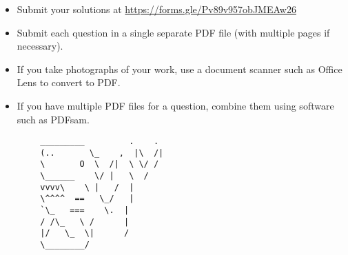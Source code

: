 \documentclass{article}
\begin{document}
	
	\vfill
	\small
	\begin{itemize}
		\item Submit your solutions at \href{https://forms.gle/Pv89v957obJMEAw26}{https://forms.gle/Pv89v957obJMEAw26}
		\item Submit each question in a single separate PDF file (with multiple pages if necessary).
		\item If you take photographs of your work, use a document scanner such as Office Lens to convert to PDF.
		\item If you have multiple PDF files for a question, combine them using software such as PDFsam.
	\end{itemize}
	
	\vfill
	\centering
	\small
	\begin{BVerbatim}
		_________         .    .
		(..       \_    ,  |\  /|
		\       O  \  /|  \ \/ /
		\______    \/ |   \  / 
		vvvv\    \ |   /  |
		\^^^^  ==   \_/   |
		`\_   ===    \.  |
		/ /\_   \ /      |
		|/   \_  \|      /
		\________/
	\end{BVerbatim}
	
\end{document}
